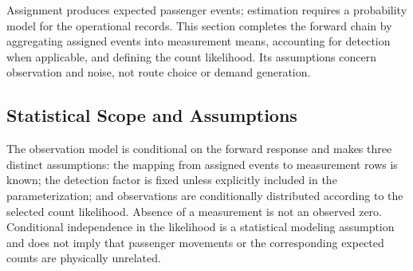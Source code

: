 


Assignment produces expected passenger events; estimation requires a
probability model for the operational records. This section completes the
forward chain by aggregating assigned events into measurement means, accounting
for detection when applicable, and defining the count likelihood. Its
assumptions concern observation and noise, not route choice or demand
generation.

\subsection{Statistical Scope and Assumptions}
\label{sec:observation-likelihood-model}

The observation model is conditional on the forward response and makes three
distinct assumptions: the mapping from assigned events to measurement rows is
known; the detection factor is fixed unless explicitly included in the
parameterization; and observations are conditionally distributed according to
the selected count likelihood.  Absence of a measurement is not an observed
zero.  Conditional independence in the likelihood is a statistical modeling
assumption and does not imply that passenger movements or the corresponding
expected counts are physically unrelated.





